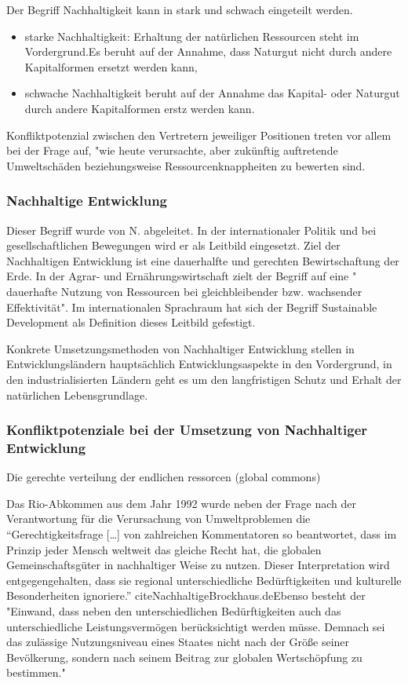 \documentclass{article}
\begin{document}
Der Begriff Nachhaltigkeit kann in stark und schwach eingeteilt werden.\cite{Nachhaltigkeit}


\begin{itemize}
\item starke Nachhaltigkeit: Erhaltung der natürlichen Ressourcen steht im Vordergrund.Es beruht auf der Annahme, dass Naturgut nicht durch andere Kapitalformen ersetzt werden kann,
\item schwache Nachhaltigkeit beruht auf der Annahme das Kapital- oder Naturgut durch andere Kapitalformen erstz werden kann.
\end{itemize}
Konfliktpotenzial zwischen den Vertretern jeweiliger Positionen treten vor allem bei der Frage auf, "wie heute verursachte, aber zukünftig auftretende Umweltschäden beziehungsweise Ressourcenknappheiten zu bewerten sind.\cite{NachhaltigeBrockhaus.de}



\subsubsection{Nachhaltige Entwicklung}
 Dieser Begriff wurde von N. abgeleitet. In der internationaler Politik und bei gesellschaftlichen Bewegungen wird er als Leitbild eingesetzt. Ziel der Nachhaltigen Entwicklung ist eine dauerhalfte und gerechten Bewirtschaftung der Erde. \cite{NachhaltigeBrockhaus.de} In der Agrar- und Ernährungswirtschaft zielt der Begriff auf eine " dauerhafte Nutzung von Ressourcen bei gleichbleibender bzw. wachsender Effektivität". \cite{oppenhauser2010nachhaltigkeit} Im internationalen Sprachraum hat sich der Begriff Sustainable Development als Definition dieses Leitbild gefestigt.
 
 Konkrete Umsetzungsmethoden von Nachhaltiger Entwicklung stellen in Entwicklungsländern hauptsächlich Entwicklungsaspekte in den Vordergrund, in den industrialisierten Ländern geht es um den langfristigen Schutz und Erhalt der natürlichen Lebensgrundlage. 

\subsubsection{Konfliktpotenziale bei der Umsetzung von Nachhaltiger Entwicklung}

Die gerechte verteilung der endlichen ressorcen (global commons)

Das Rio-Abkommen aus dem Jahr 1992 wurde neben der Frage nach der Verantwortung für die Verursachung von Umweltproblemen die “Gerechtigkeitsfrage […] von zahlreichen Kommentatoren so beantwortet, dass im Prinzip jeder Mensch weltweit das gleiche Recht hat, die globalen Gemeinschaftsgüter in nachhaltiger Weise zu nutzen. Dieser Interpretation wird entgegengehalten, dass sie regional unterschiedliche Bedürftigkeiten und kulturelle Besonderheiten ignoriere.” cite{NachhaltigeBrockhaus.de}Ebenso besteht der "Einwand, dass neben den unterschiedlichen Bedürftigkeiten auch das unterschiedliche Leistungsvermögen berücksichtigt werden müsse. Demnach sei das zulässige Nutzungsniveau eines Staates nicht nach der Größe seiner Bevölkerung, sondern nach seinem Beitrag zur globalen Wertschöpfung zu bestimmen." \cite{NachhaltigeBrockhaus.de}
\end{document}
